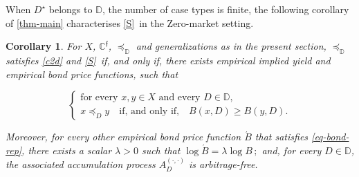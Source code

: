 \documentclass[ecta,nameyear,draft]{econsocart}
\newcommand{\novel}{\mathfrak f}
\newcommand{\mbbd}{{\mathds D}}
\newcommand{\mbbcp}{{\mathds C^{\novel}}}
\newcommand{\dd}{{(\cdot,\cdot)}}
\newcommand{\stability}{\ref{S}}
\theoremstyle{plain}
\newtheorem{corollary}{Corollary}[theorem]
\theoremstyle{remark}
\begin{document}
When $D^{\star}$ belongs to $\mbbd$, the number of case types is finite, the
following corollary of \cref{thm-main} characterises \stability\ in the
Zero-market setting.
\begin{corollary}\label{cor-bond-rep} For $X$, $\mbbcp$, $\preceq_\mbbd$ and
  generalizations as in the present section, $\preceq_{\mbbd}$ satisfies
  \ref{c2d} and \stability\ if, and only if, there exists empirical implied
  yield and empirical bond price functions, such that
  \begin{linenomath*} 
    \begin{equation}\tag{$*$}\label{eq-bond-rep} \left\{
        \begin{array}{l}
          \text{for every $x , y \in X$ and every $D \in \mbbd$,}\\
          x \preceq_{D} y \quad \text{if, and only if,}\quad B(x,D) \geq B(y,D).
      \end{array}\right.
    \end{equation}
  \end{linenomath*} 
  Moreover, for every other empirical bond price function $\acute{B}$ that
  satisfies \eqref{eq-bond-rep}, there exists a scalar $\lambda > 0$ such that
  $\log \acute{B} = \lambda \log B\,;$ and, for every $D\in \mbbd$, the
  associated accumulation process ${A}^{\dd}_{D}$ is arbitrage-free.
\end{corollary}
\end{document}
